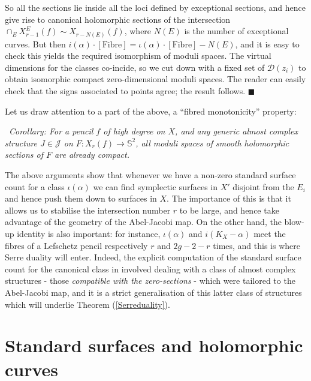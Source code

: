 \documentclass[10pt]{article}
\newcommand{\sss}{\mathbb{S}}
\newcommand{\Fibre}{\mathrm{Fibre}}
\newcounter{Universal}[section]
\renewcommand{\theUniversal}{\thesection.\arabic{Universal}}
\newenvironment{Italic}{\refstepcounter{Universal} \par \vspace{0.5cm}
\noindent {\bf (\theUniversal)}\ \it}{\par \vspace{0.5cm}}
\newenvironment{Cor}{\begin{Italic}{\sc Corollary: }}{\end{Italic}}
\newenvironment{Pf}{\par \noindent{\sc Proof:} }{\quad $\blacksquare$ \par
\vspace{0.5cm}}
\begin{document}
\begin{Pf}
\vspace{0.2cm}

\noindent So all the sections lie inside all the loci defined by
exceptional sections, and hence give rise to canonical holomorphic
sections of the intersection $\cap_E X^E_{r-1}(f) \sim X_{r-N(E)}(f)$,
where $N(E)$ is the number of exceptional curves.  But then
$i(\alpha)\cdot[\Fibre] = \iota(\alpha)\cdot[\Fibre]-N(E)$, and it is
easy to check this yields the required isomorphism of moduli spaces.
The virtual dimensions for the classes co-incide, so we cut down with
a fixed set of $\mathcal{D}(z_i)$ to obtain isomorphic compact
zero-dimensional moduli spaces.  The reader can easily check that the
signs associated to points agree; the result follows.
\end{Pf}

\noindent Let us draw attention to a part of the above, a ``fibred
monotonicity'' property:

\begin{Cor}
For a pencil $f$ of high degree on $X$, and any generic almost complex
structure $J \in \mathcal{J}$ on $F:X_r(f) \rightarrow \sss^2$, all
moduli spaces 
of smooth holomorphic sections of $F$ are already compact.
\end{Cor}

\noindent The above arguments show that whenever we
have a non-zero standard surface count for a class $\iota(\alpha)$ we
can find symplectic surfaces in $X'$ disjoint from the $E_i$ and hence
push them down to surfaces in $X$.  The importance of this is that it
allows us to stabilise the intersection number $r$ to be large, and
hence take advantage of the geometry of the Abel-Jacobi map.  On the
other hand, the blow-up identity is also important: for instance,
$\iota(\alpha)$ and $i(K_X - \alpha)$ meet the fibres of a Lefschetz
pencil respectively $r$ and $2g-2-r$ times, and this is where Serre
duality will enter.  Indeed, the explicit
computation of the standard surface count for the canonical class in
\cite{SKDIS} involved dealing with a class of almost complex structures
- those \emph{compatible with the zero-sections} - which were tailored
to the Abel-Jacobi map, and it is a strict
generalisation of this latter class of structures which will underlie
Theorem (\ref{Serreduality}).


\section{Standard surfaces and holomorphic curves}
\end{document}
